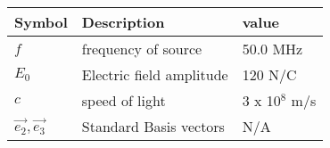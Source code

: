 \setlength{\arrayrulewidth}{0.3mm}
\setlength{\tabcolsep}{15pt}
\renewcommand{\arraystretch}{1.5}

\begin{center}
\begin{tabular}{ |p{1cm}|p{2.5cm}|p{1.7cm}|  }

\hline
Symbol& Description&value\\
\hline
$f$ & frequency of source & 50.0 MHz\\
\hline
$E_0$ & Electric field amplitude  & 120 N/C\\
\hline
$c$ &speed of light & 3 x 10$^8$ m/s \\
\hline
$\vec{e_2}, \vec{e_3}$ & Standard Basis vectors & N/A\\
\hline

\end{tabular}
\end{center}